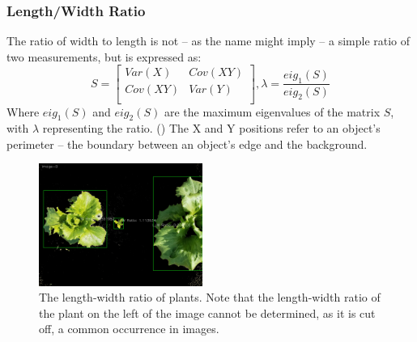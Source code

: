 \documentclass[letterpaper]{report}
\begin{document}
{%

\subsubsection{Length/Width Ratio}
\label{sec:length-width-ratio}
The ratio of width to length is not -- as the name might imply -- a simple ratio of two measurements, but is expressed as:
\begin{equation}
S = 
	\begin{bmatrix}
	Var(X) & Cov(XY) \\[0.3em]
	Cov(XY) & Var(Y) \\[0.3em]
	\end{bmatrix},
\lambda = \frac {eig_{1}(S)} {eig_{2}(S)}
\end{equation}
Where $eig_{1}(S)$ and $eig_{2}(S)$ are the maximum eigenvalues of the matrix $S$, with $\lambda$ representing the ratio. (\cite{Lin2017-xq}) The X and Y positions refer to an object's perimeter -- the boundary between an object's edge and the background.


\begin{figure}[h!]
	\centering
	\includegraphics[height=4cm]{./figures/shape-lw-ratio.jpg}
	\caption[Shape attribute: Length-Width ratio]{The length-width ratio of plants. Note that the length-width ratio of the plant on the left of the image cannot be determined, as it is cut off, a common occurrence in images.}
	\label{fig:shape-area}
\end{figure}

}
\end{document}
